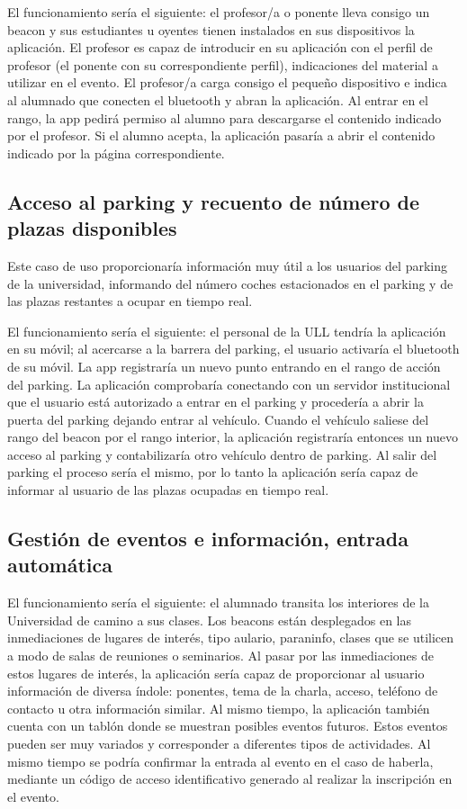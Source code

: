 El funcionamiento sería el siguiente: el profesor/a o ponente lleva consigo un beacon y sus estudiantes u oyentes tienen instalados en sus dispositivos la aplicación. El profesor es capaz de introducir en su aplicación con el perfil de profesor (el ponente con su correspondiente perfil), indicaciones del material a utilizar en el evento. El profesor/a carga consigo el pequeño dispositivo e indica al alumnado que conecten el bluetooth y abran la aplicación. Al entrar en el rango, la app pedirá permiso al alumno para descargarse el contenido indicado por el profesor. Si el alumno acepta, la aplicación pasaría a abrir  el contenido indicado por la página correspondiente.


\subsection{Acceso al parking y recuento de número de plazas disponibles}


Este caso de uso proporcionaría información muy útil a los usuarios del parking de la universidad, informando del número coches estacionados en el parking y de las plazas restantes a ocupar en tiempo real.

El funcionamiento sería el siguiente: el personal de la ULL tendría la aplicación en su móvil; al acercarse a la barrera del parking, el usuario activaría el bluetooth de su móvil. La app registraría un nuevo punto entrando en el rango de acción del parking. La aplicación comprobaría conectando con un servidor institucional que el usuario está autorizado a entrar en el parking y procedería a abrir la puerta del parking dejando entrar al vehículo. Cuando el vehículo saliese del rango del beacon por el rango interior, la aplicación registraría entonces un nuevo acceso al parking y contabilizaría otro vehículo dentro de parking. Al salir del parking el proceso sería el mismo, por lo tanto la aplicación sería capaz de informar al usuario de las plazas ocupadas en tiempo real.


\subsection{Gestión de eventos e información, entrada automática}

El funcionamiento sería el siguiente: el alumnado transita los interiores de la Universidad de camino a sus clases. Los beacons están desplegados en las inmediaciones de lugares de interés, tipo aulario, paraninfo, clases que se utilicen a modo de salas de reuniones o seminarios. Al pasar por las inmediaciones de estos lugares de interés, la aplicación sería capaz de proporcionar al usuario información de diversa índole: ponentes, tema de la charla, acceso, teléfono de contacto u otra información similar.  Al mismo tiempo, la aplicación también cuenta con un tablón donde se muestran posibles eventos futuros. Estos eventos pueden ser muy variados y corresponder a diferentes tipos de actividades. Al mismo tiempo se podría confirmar la entrada al evento en el caso de haberla, mediante un código de acceso identificativo generado al realizar la inscripción en el evento.

